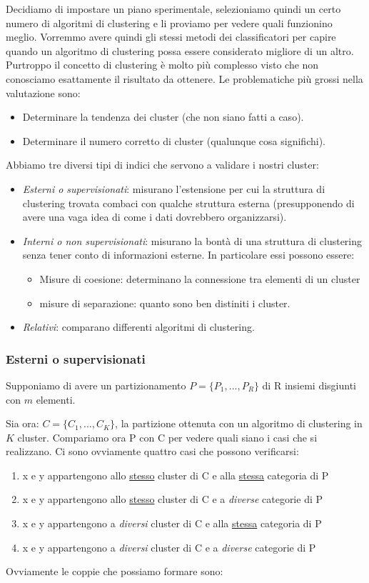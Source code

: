 Decidiamo di impostare un piano sperimentale, selezioniamo quindi  un certo numero di algoritmi di clustering e li proviamo per vedere quali funzionino meglio. Vorremmo avere quindi gli stessi metodi dei classificatori per capire quando un algoritmo di clustering possa essere considerato migliore di un altro. Purtroppo il concetto di clustering è molto più complesso visto che non conosciamo esattamente il risultato da ottenere.
Le problematiche più grossi nella valutazione sono:
\begin{itemize}
	\item Determinare la tendenza dei cluster (che non siano fatti a caso).
	\item Determinare il numero corretto di cluster (qualunque cosa significhi).
\end{itemize} 
Abbiamo tre diversi tipi di indici che servono a validare i nostri cluster:
\begin{itemize}
	\item \textit{Esterni o supervisionati}: misurano l'estensione per cui la struttura di clustering trovata combaci con qualche struttura esterna (presupponendo di avere una vaga idea di come i dati dovrebbero organizzarsi).
	\item \textit{Interni o non supervisionati}: misurano la bontà di una struttura di clustering senza tener conto di informazioni esterne. In particolare essi possono essere:
	\begin{itemize}
		\item Misure di coesione: determinano la connessione tra elementi di un cluster
		\item misure di separazione: quanto sono ben distiniti i cluster. 
	\end{itemize}
	\item \textit{Relativi}: comparano differenti algoritmi di clustering. 
\end{itemize}
\subsubsection{Esterni o supervisionati}

Supponiamo di avere un partizionamento $P = \{P_{1}, ..., P_{R}\}$ di R insiemi disgiunti con $m$ elementi. 

Sia ora: $C = \{C_{1}, ..., C_{K}\}$, la partizione ottenuta con un algoritmo di clustering in $K$ cluster. Compariamo ora P con C per vedere quali siano i casi che si realizzano.
Ci sono ovviamente quattro casi che possono verificarsi:
\begin{enumerate}
	\item  x e y appartengono allo \underline{stesso} cluster di C e alla \underline{stessa} categoria di P
	\item  x e y appartengono allo \underline{stesso} cluster di C e a \textit{diverse} categorie di P
	\item  x e y appartengono a \textit{diversi} cluster di C e alla \underline{stessa} categoria di P
	\item  x e y appartengono a \textit{diversi} cluster di C e a \textit{diverse} categorie di P
\end{enumerate}
Ovviamente le coppie che possiamo formare sono:

